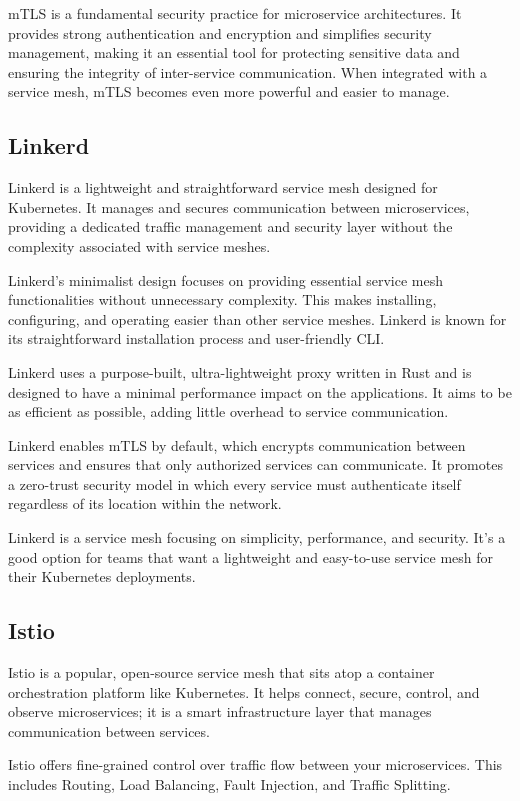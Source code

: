 mTLS is a fundamental security practice for microservice architectures.
It provides strong authentication and encryption and simplifies security
management, making it an essential tool for protecting sensitive data
and ensuring the integrity of inter-service communication. When
integrated with a service mesh, mTLS becomes even more powerful and
easier to manage.

\subsection{Linkerd}

Linkerd is a lightweight and straightforward service mesh designed for
Kubernetes. It manages and secures communication between microservices,
providing a dedicated traffic management and security layer without the
complexity associated with service meshes.

Linkerd's minimalist design focuses on providing essential service
mesh functionalities without unnecessary complexity. This makes
installing, configuring, and operating easier than other service meshes.
Linkerd is known for its straightforward installation process and
user-friendly CLI.

Linkerd uses a purpose-built, ultra-lightweight proxy written in Rust
and is designed to have a minimal performance impact on the
applications. It aims to be as efficient as possible, adding little
overhead to service communication.

Linkerd enables mTLS by default, which encrypts communication between
services and ensures that only authorized services can communicate. It
promotes a zero-trust security model in which every service must
authenticate itself regardless of its location within the network.

Linkerd is a service mesh focusing on simplicity, performance, and
security. It's a good option for teams that want a lightweight and
easy-to-use service mesh for their Kubernetes deployments.

\subsection{Istio}

Istio is a popular, open-source service mesh that sits atop a container
orchestration platform like Kubernetes. It helps connect, secure,
control, and observe microservices; it is a smart infrastructure layer
that manages communication between services.

Istio offers fine-grained control over traffic flow between your
microservices. This includes Routing, Load Balancing, Fault Injection,
and Traffic Splitting.

